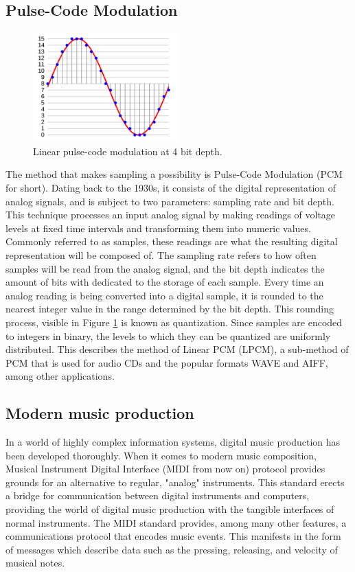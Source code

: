 \documentclass[12pt, a4paper, hidelinks]{report}
\begin{document}
	
	\subsection{Pulse-Code Modulation}
	\begin{figure}[h]
		\centering
		\includegraphics[width=0.5\textwidth]{pcm.png}
		\caption{Linear pulse-code modulation at 4 bit depth.}
		\label{fig:pcm}
	\end{figure}
	The method that makes sampling a possibility is Pulse-Code Modulation (PCM for short). Dating back to the 1930s, it consists of the digital representation of analog signals, and is subject to two parameters: sampling rate and bit depth. This technique processes an input analog signal by making readings of voltage levels at fixed time intervals and transforming them into numeric values. Commonly referred to as samples, these readings are what the resulting digital representation will be composed of. The sampling rate refers to how often samples will be read from the analog signal, and the bit depth indicates the amount of bits with dedicated to the storage of each sample. Every time an analog reading is being converted into a digital sample, it is rounded to the nearest integer value in the range determined by the bit depth. This rounding process, visible in Figure \ref{fig:pcm} \cite{pcm_img} is known as quantization. Since samples are encoded to integers in binary, the levels to which they can be quantized are uniformly distributed. This describes the method of Linear PCM (LPCM), a sub-method of PCM that is used for audio CDs and the popular formats WAVE and AIFF, among other applications.\par
	
	
	
	\subsection{Modern music production}     
	In a world of highly complex information systems, digital music production has been developed thoroughly. When it comes to modern music composition, Musical Instrument Digital Interface (MIDI from now on) \cite{midi}    protocol provides grounds for an alternative to regular, "analog" instruments. This standard erects a bridge for communication between digital instruments and computers, providing the world of digital music production with the tangible interfaces of normal instruments. The MIDI standard provides, among many other features, a communications protocol that encodes music events. This manifests in the form of messages which describe data such as the pressing, releasing, and velocity of musical notes.    
	
\end{document}
